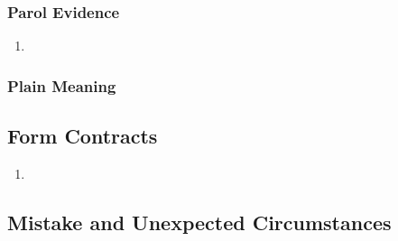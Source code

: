 \subsubsection{Parol Evidence}

\begin{enumerate}
    \item %
\end{enumerate}

\subsubsection{Plain Meaning}


\subsection{Form Contracts}

\begin{enumerate}
    \item %
\end{enumerate}

\subsection{Mistake and Unexpected Circumstances}


